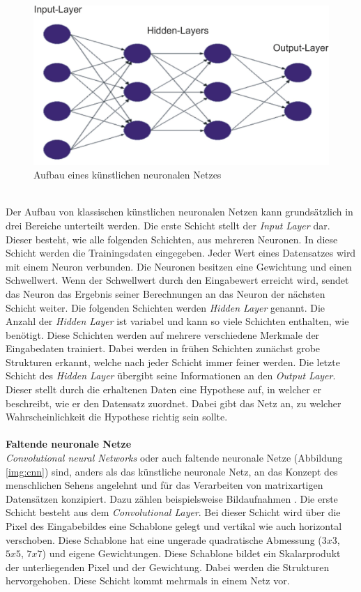 \begin{figure}
	[h]
	\centering
	\includegraphics[scale=0.5]{Sources/nnet.png}
	\caption{Aufbau eines künstlichen neuronalen Netzes \cite{bistra2018pic}}
	\label{img:neuronales_netz}
\end{figure}\\
Der Aufbau von klassischen künstlichen neuronalen Netzen kann grundsätzlich in drei Bereiche unterteilt werden. Die erste Schicht stellt der \textit{Input Layer} dar. Dieser besteht, wie alle folgenden Schichten, aus mehreren Neuronen. In diese Schicht werden die Trainingsdaten eingegeben. Jeder Wert eines Datensatzes wird mit einem Neuron verbunden. Die Neuronen besitzen eine Gewichtung und einen Schwellwert. Wenn der Schwellwert durch den Eingabewert erreicht wird, sendet das Neuron das Ergebnis seiner Berechnungen an das Neuron der nächsten Schicht weiter. Die folgenden Schichten werden \textit{Hidden Layer} genannt. Die Anzahl der \textit{Hidden Layer} ist variabel und kann so viele Schichten enthalten, wie benötigt. Diese Schichten werden auf mehrere verschiedene Merkmale der Eingabedaten trainiert. Dabei werden in frühen Schichten zunächst grobe Strukturen erkannt, welche nach jeder Schicht immer feiner werden. Die letzte Schicht des \textit{Hidden Layer} übergibt seine Informationen an den \textit{Output Layer}. Dieser stellt durch die erhaltenen Daten eine Hypothese auf, in welcher er beschreibt, wie er den Datensatz zuordnet. Dabei gibt das Netz an, zu welcher Wahrscheinlichkeit die Hypothese richtig sein sollte.\\\\
\textbf{Faltende neuronale Netze}\label{s.cnn}\\
\textit{Convolutional neural Networks} oder auch faltende neuronale Netze (Abbildung \ref{img:cnn}) sind, anders als das künstliche neuronale Netz, an das Konzept des menschlichen Sehens angelehnt \cite{sermanet2012convolutional} und für das Verarbeiten von matrixartigen Datensätzen konzipiert. Dazu zählen beispielsweise Bildaufnahmen \cite{goodfellow2016deep}. Die erste Schicht besteht aus dem \textit{Convolutional Layer}. Bei dieser Schicht wird über die Pixel des Eingabebildes eine Schablone gelegt und vertikal wie auch horizontal verschoben. Diese Schablone hat eine ungerade quadratische Abmessung ($3x3$, $5x5$, $7x7$) und eigene Gewichtungen. Diese Schablone bildet ein Skalarprodukt der unterliegenden Pixel und der Gewichtung. Dabei werden die Strukturen hervorgehoben. Diese Schicht kommt mehrmals in einem Netz vor.\\  
